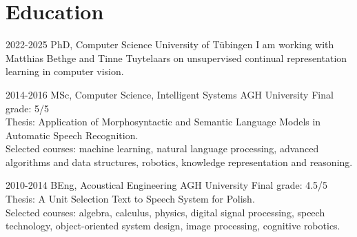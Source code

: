 \documentclass[]{friggeri-cv_osx}
\begin{document}
\section{Education}
\begin{entrylist}

\entry
{2022-2025}
{PhD, Computer Science}
{University of Tübingen}
{I am working with Matthias Bethge and Tinne Tuytelaars on unsupervised continual representation learning in computer vision.\\}

\entry
{2014-2016}
{MSc, Computer Science, Intelligent Systems}
{AGH University}
{Final grade: 5/5\\
Thesis: Application of Morphosyntactic and Semantic Language Models in Automatic Speech Recognition.\\
Selected courses: machine learning, natural language processing, advanced algorithms and data structures, robotics, knowledge representation and reasoning.\\}

\entry
{2010-2014}
{BEng, Acoustical Engineering}
{AGH University}
{Final grade: 4.5/5\\
Thesis: A Unit Selection Text to Speech System for Polish.\\
Selected courses: algebra, calculus, physics, digital signal processing, speech technology, object-oriented system design, image processing, cognitive robotics.}
\end{entrylist}


\newpage
\end{document}
